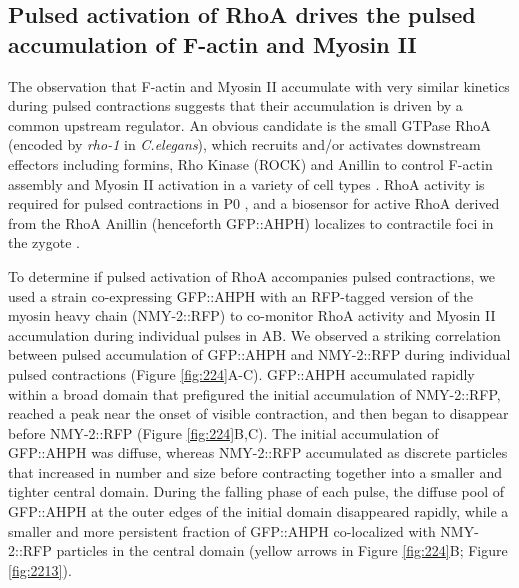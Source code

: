 \subsection{Pulsed activation of RhoA drives the pulsed accumulation of F-actin and Myosin II}
The observation that F-actin and Myosin II accumulate with very similar kinetics during pulsed contractions suggests that their accumulation is driven by a common upstream regulator. An obvious candidate is the small GTPase RhoA (encoded by \textit{rho-1} in \textit{C.elegans}), which recruits and/or activates downstream effectors including formins, Rho Kinase (ROCK) and Anillin to control F-actin assembly and Myosin II activation in a variety of cell types  \cite{Jaffe:2005kq, Piekny:2008jf}. RhoA activity is required for pulsed contractions in P0  \cite{Motegi:2006hi, Schonegg:2007if, Tse:2012fp}, and a biosensor for active RhoA derived from the RhoA Anillin (henceforth GFP::AHPH) localizes to contractile foci in the zygote  \cite{Tse:2011gd}. 

To determine if pulsed activation of RhoA accompanies pulsed contractions, we used a strain co-expressing GFP::AHPH  \cite{Tse:2012fp} with an RFP-tagged version of the myosin heavy chain (NMY-2::RFP) to co-monitor RhoA activity and Myosin II accumulation during individual pulses in AB.  We observed a striking correlation between pulsed accumulation of GFP::AHPH and NMY-2::RFP during individual pulsed contractions (Figure \ref{fig:224}A-C).  GFP::AHPH accumulated rapidly within a broad domain that prefigured the initial accumulation of NMY-2::RFP, reached a peak near the onset of visible contraction, and then began to disappear before NMY-2::RFP (Figure \ref{fig:224}B,C). The initial accumulation of GFP::AHPH was diffuse, whereas NMY-2::RFP accumulated as discrete particles that increased in number and size before contracting together into a smaller and tighter central domain. During the falling phase of each pulse, the diffuse pool of GFP::AHPH at the outer edges of the initial domain disappeared rapidly, while a smaller and more persistent fraction of GFP::AHPH co-localized with NMY-2::RFP particles in the central domain (yellow arrows in Figure \ref{fig:224}B; Figure \ref{fig:2213}).

